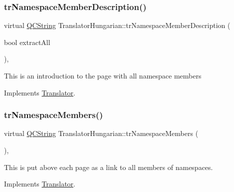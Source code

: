 \mbox{\label{class_translator_hungarian_ad40c4de1ff540cbc9287b56592621b22}} 
\subsubsection{\texorpdfstring{trNamespaceMemberDescription()}{trNamespaceMemberDescription()}}
{\footnotesize\ttfamily virtual \mbox{\hyperlink{class_q_c_string}{Q\+C\+String}} Translator\+Hungarian\+::tr\+Namespace\+Member\+Description (\begin{DoxyParamCaption}\item[{bool}]{extract\+All }\end{DoxyParamCaption})\hspace{0.3cm}{\ttfamily [inline]}, {\ttfamily [virtual]}}

This is an introduction to the page with all namespace members 

Implements \mbox{\hyperlink{class_translator}{Translator}}.

\mbox{\label{class_translator_hungarian_a1747e00bbeb740b1040f44ea564b3ab6}} 
\subsubsection{\texorpdfstring{trNamespaceMembers()}{trNamespaceMembers()}}
{\footnotesize\ttfamily virtual \mbox{\hyperlink{class_q_c_string}{Q\+C\+String}} Translator\+Hungarian\+::tr\+Namespace\+Members (\begin{DoxyParamCaption}{ }\end{DoxyParamCaption})\hspace{0.3cm}{\ttfamily [inline]}, {\ttfamily [virtual]}}

This is put above each page as a link to all members of namespaces. 

Implements \mbox{\hyperlink{class_translator}{Translator}}.

\mbox{\label{class_translator_hungarian_a5c8b87e61393da3f1f0da488caa42a5d}} 
